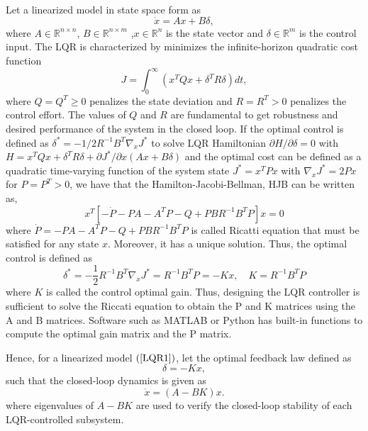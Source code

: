 \documentclass[10pt]{article}
\begin{document}
Let a linearized model in state space form as  
%
\begin{equation}\label{LQR1}
    \dot{x}=Ax+B\delta,
\end{equation}
where $A\in\mathbb{R}^{n\times n}$, $B\in\mathbb{R}^{n\times m}$ ,$x\in\mathbb{R}^{n}$ is the state vector and
$\delta\in\mathbb{R}^{m}$ is the control input. The LQR is characterized by minimizes the infinite-horizon quadratic cost function
\begin{equation}
    J=\int_{0}^{\infty}
    \left(
        x^{T}Qx+\delta^{T}R\delta
    \right)dt,
\end{equation}
where $Q=Q^{T}\geq 0$ penalizes the state deviation and
$R=R^{T}>0$ penalizes the control effort.  The values of $Q$ and $R$ are fundamental to get robustness and desired performance of the system in the closed loop. 
%
If the optimal control is defined as $\delta^*=-1/2R^{-1}B^T\nabla_x J^*$ to solve LQR Hamiltonian $\partial H/\partial\delta=0$ with $H=x^TQx+\delta^TR\delta+\partial J^*/\partial x (Ax+B\delta)$ and the optimal cost can be defined as a quadratic time-varying function of the system state $J^*=x^TPx$ with $\nabla_x J^*=2Px$ for $P=P^T>0$, we have that the Hamilton-Jacobi-Bellman, HJB can be written as, \cite{LewisBook}
\begin{equation}
    x^T[-\dot{P}-PA-A^TP-Q+PBR^{-1}B^TP]x=0
\end{equation}
where $\dot{P}=-PA-A^TP-Q+PBR^{-1}B^TP$ is called Ricatti equation that must be satisfied for any state $x$. Moreover, it has a unique solution. Thus, the optimal control is defined as
\begin{equation}
    \delta^*=-\frac{1}{2}R^{-1}B^T\nabla_x J^*=R^{-1}B^TP=-Kx,\quad K=R^{-1}B^TP
\end{equation}
where $K$ is called the control optimal gain.
%
Thus, designing the LQR controller is sufficient to solve the Riccati equation to obtain the P and K matrices using the A and B matrices. 
%
Software such as MATLAB or Python has built-in functions to compute the optimal gain matrix and the P matrix.

Hence, for a linearized model $(\ref{LQR1})$, let the optimal feedback law defined as
\begin{equation}
    \delta=-Kx,
\end{equation}
%
such that the closed-loop dynamics is given as
\begin{equation}
    \dot{x}=(A-BK)x.
\end{equation}
where eigenvalues of $A-BK$ are used to verify the closed-loop stability
of each LQR-controlled subsystem.
\end{document}
